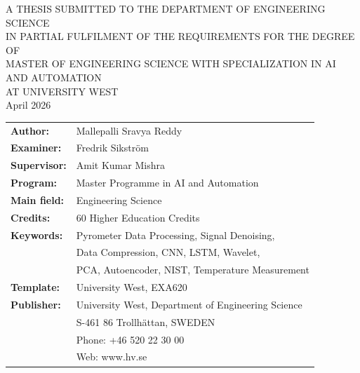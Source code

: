 \newpage
\thispagestyle{empty}
\begin{center}
\vspace*{2cm}
{\small A THESIS SUBMITTED TO THE DEPARTMENT OF ENGINEERING SCIENCE\\
IN PARTIAL FULFILMENT OF THE REQUIREMENTS FOR THE DEGREE OF\\
MASTER OF ENGINEERING SCIENCE WITH SPECIALIZATION IN AI AND AUTOMATION\\
AT UNIVERSITY WEST}\\[2cm]

{\large April 2026}\\[1cm]

\begin{tabular}{ll}
\textbf{Author:}     & Mallepalli Sravya Reddy\\[0.5cm]
\textbf{Examiner:}   & Fredrik Sikstr\"{o}m\\[0.5cm]
\textbf{Supervisor:} & Amit Kumar Mishra\\[0.5cm]
\textbf{Program:}    & Master Programme in AI and Automation\\[0.5cm]
\textbf{Main field:} & Engineering Science\\[0.5cm]
\textbf{Credits:}    & 60 Higher Education Credits\\[0.5cm]
\textbf{Keywords:}   & Pyrometer Data Processing, Signal Denoising,\\
                     & Data Compression, CNN, LSTM, Wavelet,\\
                     & PCA, Autoencoder, NIST, Temperature Measurement\\[0.5cm]
\textbf{Template:}   & University West, EXA620\\[0.5cm]
\textbf{Publisher:}  & University West, Department of Engineering Science\\
                     & S-461 86 Trollh\"{a}ttan, SWEDEN\\
                     & Phone: +46 520 22 30 00\\
                     & Web: www.hv.se
\end{tabular}
\end{center}
\clearpage
